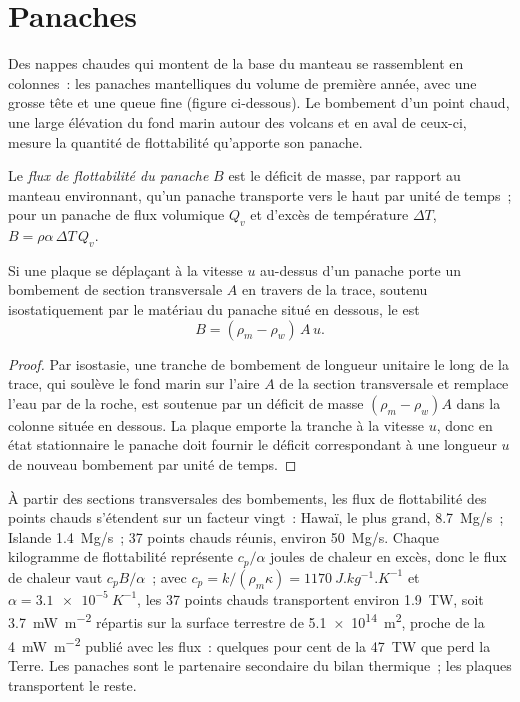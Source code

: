 \section{Panaches}

Des nappes chaudes qui montent de la base du manteau se rassemblent en colonnes~: les panaches
mantelliques du volume de première année, avec une grosse tête et une queue fine (figure ci-dessous).
Le bombement d'un point chaud, une large élévation du fond marin autour des volcans et en aval de
ceux-ci, mesure la quantité de flottabilité qu'apporte son panache.

\begin{definition}\label{def:b3:mantle-convection:buoyancy-flux}
Le \emph{flux de flottabilité du panache} $B$ est le
déficit de masse, par rapport au manteau environnant, qu'un panache transporte vers le haut par
unité de temps~; pour un panache de flux volumique $Q_v$ et d'excès de température $\Delta T$,
$B = \rho\alpha\,\Delta T\,Q_v$.
\end{definition}

\begin{proposition}\label{prop:b3:mantle-convection:swell}
Si une plaque se déplaçant à la vitesse $u$ au-dessus d'un panache porte un bombement de
section transversale $A$ en travers de la trace, soutenu isostatiquement par le
matériau du panache situé en dessous, le  est
\[
  B = (\rho_m - \rho_w)\,A\,u .
\]
\end{proposition}

\begin{proof}
Par isostasie, une tranche de bombement de longueur unitaire le long de la trace, qui soulève
le fond marin sur l'aire $A$ de la section transversale et remplace l'eau par
de la roche, est soutenue par un déficit de masse $(\rho_m - \rho_w)A$ dans la colonne située en dessous.
La plaque emporte la tranche à la vitesse $u$, donc en état stationnaire le
panache doit fournir le déficit correspondant à une longueur $u$ de nouveau bombement par unité de temps.
\end{proof}

À partir des sections transversales des bombements, les flux de flottabilité des points chauds s'étendent sur
un facteur vingt~: Hawaï, le plus grand, \qty{8.7}{Mg/s}~; Islande
\qty{1.4}{Mg/s}~; 37 points chauds réunis, environ \qty{50}{Mg/s}. Chaque kilogramme de
flottabilité représente $c_p/\alpha$ joules de chaleur en excès, donc le flux de chaleur vaut $c_pB/\alpha$~;
avec $c_p = k/(\rho_m\kappa) = \qty{1170}{J.kg^{-1}.K^{-1}}$ et $\alpha =
\qty{3.1e-5}{K^{-1}}$, les 37 points chauds transportent environ \qty{1.9}{TW}, soit
\qty{3.7}{mW.m^{-2}} répartis sur la surface terrestre de \qty{5.1e14}{m^2}, proche de la
\qty{4}{mW.m^{-2}} publié avec les flux~: quelques pour cent de la
\qty{47}{TW} que perd la Terre. Les panaches sont le partenaire secondaire du
bilan thermique~; les plaques transportent le reste.

